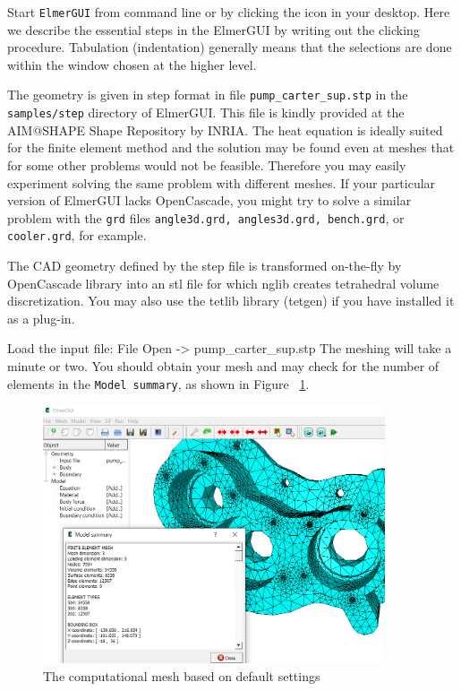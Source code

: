 Start \texttt{ElmerGUI} from command line or by clicking the icon in your desktop. Here we describe the essential steps in the ElmerGUI by writing out the clicking procedure. Tabulation (indentation) generally means that the selections are done within the window chosen at the higher level. 

The geometry is given in step format in file \texttt{pump\_carter\_sup.stp} in the \texttt{samples/step} directory of ElmerGUI.  This file is kindly provided at the AIM@SHAPE Shape Repository by INRIA.  The heat equation is ideally suited for the finite element method and the solution may be found even at meshes that for some other problems would not be feasible. Therefore you may easily experiment solving the same problem with different meshes. If your particular version of ElmerGUI lacks OpenCascade, you might try to solve a similar problem with the \texttt{grd} files \texttt{angle3d.grd, angles3d.grd, bench.grd}, or \texttt{cooler.grd}, for example.

The CAD geometry defined by the step file is transformed on-the-fly by OpenCascade library into an stl file for which nglib creates tetrahedral volume discretization.  You may also use the tetlib library (tetgen) if you have installed it as a plug-in.

Load the input file:
\ttbegin
File 
  Open -> pump_carter_sup.stp
\ttend
The meshing will take a minute or two.  You should obtain your mesh and may check for the number of elements in the \texttt{Model summary}, as shown in Figure ~\ref{fg:mesh-default}.\\

\begin{figure}[H]
\begin{center}
\includegraphics[width=0.90\textwidth]{mesh-default}
\caption{The computational mesh based on default settings}\label{fg:mesh-default}
\end{center}
\end{figure}

